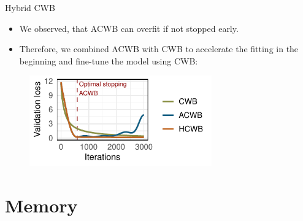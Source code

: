 \documentclass[ignorenonframetext,]{beamer}
\providecommand{\tightlist}{%
  \setlength{\itemsep}{0pt}\setlength{\parskip}{0pt}}
\begin{document}
\begin{frame}{Hybrid CWB}
\protect\hypertarget{hybrid-cwb}{}
\begin{itemize}
\tightlist
\item
  We observed, that ACWB can overfit if not stopped early.
\item
  Therefore, we combined ACWB with CWB to accelerate the fitting in the
  beginning and fine-tune the model using CWB:
\end{itemize}

\begin{figure}
\centering
\includegraphics[width=0.7\textwidth]{figures/fig-optim-emp-risk.pdf}
\end{figure}
\end{frame}

\hypertarget{memory}{%
\section{Memory}\label{memory}}
\end{document}
